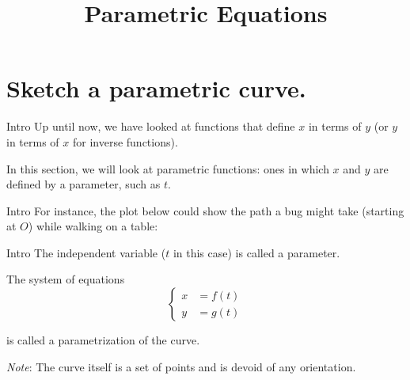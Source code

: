 \documentclass[t,usenames,dvipsnames]{beamer}
\title{Parametric Equations}
\author{}
\date{}
\begin{document}
\begin{frame}
    \titlepage
\end{frame}

\section{Sketch a parametric curve.}

\begin{frame}{Intro}
Up until now, we have looked at functions that define $x$ in terms of $y$ (or $y$ in terms of $x$ for inverse functions). \newline\\ \pause

In this section, we will look at parametric functions: ones in which $x$ and $y$ are defined by a \alert{parameter}, such as $t$.
\end{frame}

\begin{frame}{Intro}
For instance, the plot below could show the path a bug might take (starting at $O$) while walking on a table: \newline\\

\begin{center}
\end{center}    
\end{frame}

\begin{frame}{Intro}
The independent variable ($t$ in this case) is called a \alert{parameter}.    \newline\\  \pause

The system of equations
\[
\begin{cases}
    x &= f(t)   \\
    y &= g(t)     
\end{cases}
\]

is called a \alert{parametrization} of the curve.   \newline\\  \pause

\emph{Note}: The curve itself is a set of points and is devoid of any orientation.  
\end{frame}
\end{document}
